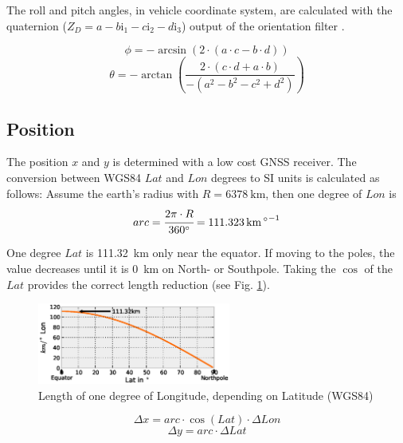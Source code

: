 \documentclass[conference]{IEEEtran}
\begin{document}
The roll and pitch angles, in vehicle coordinate system, are calculated with the quaternion ($Z_D=a-b\mathrm{i}_1-c\mathrm{i}_2-d\mathrm{i}_3$) output of the orientation filter \cite{Buchholz2013}.

\begin{equation}\label{rollangle}\phi = -\arcsin(2\cdot(a\cdot c - b \cdot d))\end{equation}
\begin{equation}\label{pitchangle}\theta = -\arctan\left(\frac{2\cdot(c\cdot d + a\cdot b)}{-(a^2-b^2-c^2+d^2)}\right)\end{equation}

\subsection{Position}

The position $x$ and $y$ is determined with a low cost GNSS receiver. The conversion between WGS84 $Lat$ and $Lon$ degrees to SI units is calculated as follows:
Assume the earth's radius with $R=\SI{6378}{\kilo\metre}$, then one degree of $Lon$ is
\begin{equation}arc = \cfrac{2 \pi\cdot R}{\SI{360}{\degree}} =  \SI{111.323}{\kilo\metre\per\degree}\end{equation}

One degree $Lat$ is \SI{111.32}{\kilo\metre} only near the equator. If moving to the poles, the value decreases until it is \SI{0}{\kilo\metre} on North- or Southpole. Taking the $\cos$ of the $Lat$ provides the correct length reduction (see Fig. \ref{LonLatEquatorNorthpole}).

\begin{figure}[ht]
\centering
\includegraphics[width=2.5in]{images/Longitude-Cos-Latitude-Equator-Northpole}
\caption{Length of one degree of Longitude, depending on Latitude (WGS84)}
\label{LonLatEquatorNorthpole}
\end{figure}

\begin{equation}\label{deltax}\Delta x = arc\cdot\cos(Lat)\cdot\Delta Lon\end{equation}
\begin{equation}\label{deltay}\Delta y = arc\cdot\Delta Lat\end{equation}
\end{document}
